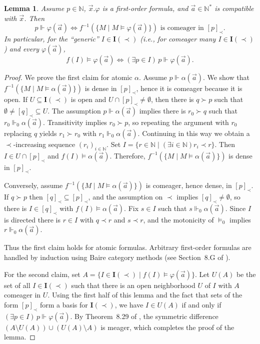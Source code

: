 \documentclass{article}
\theoremstyle{plain}
\newtheorem{lemma}[Theorem]{Lemma}
\def\IN{{\mathbb N}}
\def\I#1{{{\mathrm{\mathbf I}}(#1)}}
\begin{document}
\begin{lemma}
Assume $p\in\IN$,  $\vec{x}.\varphi$ is a first-order formula, and $\vec{a}\in\IN^*$ is compatible with $\vec{x}$. Then 
\[p\Vdash \varphi(\vec{a}) \iff f^{-1}(\{ M \mid M \vDash \varphi(\vec{a})\}) \text{ is comeager in } [p]_\prec.\]
In particular, for the ``generic'' $I\in\I{\prec}$ (i.e., for comeager many $I\in\I{\prec}$) and every $\varphi(\vec{a})$,
\[f(I)\vDash \varphi(\vec{a}) \iff (\exists p\in I)\, p\Vdash \varphi(\vec{a}).\] 
\end{lemma}
\begin{proof}
We prove the first claim for atomic $\alpha$. Assume $p\Vdash \alpha(\vec{a})$. We show that $f^{-1}(\{ M \mid M \vDash \alpha(\vec{a})\})$ is dense in $[p]_\prec$, hence it is comeager because it is open. If $U\subseteq\I{\prec}$ is open and $U\cap[p]_\prec\not=\emptyset$, then there is $q\succ p$ such that $\emptyset\not=[q]_\prec \subseteq U$.  The assumption $p\Vdash \alpha(\vec{a})$ implies there is $r_0\succ q$ such that $r_0 \Vdash_0 \alpha(\vec{a})$. Transitivity implies $r_0\succ p$, so repeating the argument with $r_0$ replacing $q$ yields $r_1 \succ r_0$ with $r_1\Vdash_0 \alpha(\vec{a})$. Continuing in this way we obtain a $\prec$-increasing sequence $(r_i)_{i\in\IN}$. Set $I=\{r\in\IN\mid (\exists i\in\IN) r_i \prec r\}$. Then $I\in U\cap[p]_\prec$ and $f(I)\vDash \alpha(\vec{a})$. Therefore, $f^{-1}(\{ M \mid M \vDash \alpha(\vec{a})\})$ is dense in $[p]_\prec$.

Conversely, assume $f^{-1}(\{ M \mid M \vDash \alpha(\vec{a})\})$ is comeager, hence dense, in $[p]_\prec$. If $q\succ p$ then  $[q]_\prec\subseteq [p]_\prec$, and the assumption on $\prec$ implies $[q]_\prec\not=\emptyset$, so there is $I\in [q]_\prec$ with $f(I)\vDash\alpha(\vec{a})$. Fix $s\in I$ such that $s\Vdash_0\alpha(\vec{a})$. Since $I$ is directed there is $r\in I$ with $q\prec r$ and $s\prec r$, and the motonicity of $\vDash_0$ implies $r\Vdash_0 \alpha(\vec{a})$.

Thus the first claim holds for atomic formulas. Arbitrary first-order formulas are handled by induction using Baire category methods (see Section~8.G of \cite{ke95}).

For the second claim, set $A = \{ I\in\I{\prec} \mid f(I) \vDash \varphi(\vec{a})\}$. Let $U(A)$ be the set of all $I\in\I{\prec}$ such that there is an open neighborhood $U$ of $I$ with $A$ comeager in $U$. Using the first half of this lemma and the fact that sets of the form $[p]_\prec$ form a basis for $\I{\prec}$, we have $I \in U(A)$ if and only if $(\exists p\in I)\, p\Vdash\varphi(\vec{a})$. By Theorem~8.29 of \cite{ke95}, the symmetric difference $(A\setminus U(A)) \cup (U(A)\setminus A)$ is meager, which completes the proof of the lemma.
\end{proof}
\end{document}
